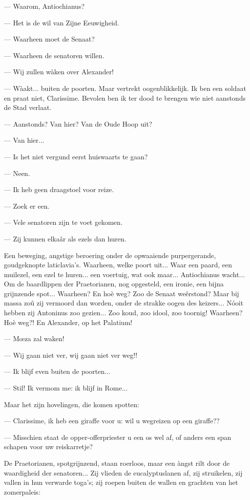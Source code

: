 \documentclass[a4paper, 12pt, oneside, dutch]{article}
\begin{document}
--- Waarom, Antiochianus?

--- Het is de wil van Zijne Eeuwigheid.

--- Waarheen moet de Senaat?

--- Waarheen de senatoren willen.

--- Wij zullen wàken over Alexander!

--- Wàakt... buiten de poorten. Maar vertrekt oogenblikkelijk. Ik ben een soldaat en praat niet, Clarissime. Bevolen ben ik ter dood te brengen wie niet aanstonds de Stad verlaat.

--- Aanstonds? Van hier? Van de Oude Hoop uit?

--- Van hier...

--- Is het niet vergund eerst huiswaarts te gaan?

--- Neen.

--- Ik heb geen draagstoel voor reize.

--- Zoek er een.

--- Vele senatoren zijn te voet gekomen.

--- Zij kunnen elkaâr als ezels dan huren.

Een beweging, angstige beroering onder de opwaaiende purpergerande, goudgeknopte laticlavia's. Waarheen, welke poort uit... Waar een paard, een muilezel, een ezel te huren... een voertuig, wat ook maar... Antiochianus wacht... Om de baardlippen der Praetorianen, nog opgesteld, een ironie, een bijna grijnzende spot... Waarheen? En hoè weg? Zoo de Senaat weêrstond? Maar bij massa zoû zij vermoord dan worden, onder de strakke oogen des keizers... Nóoit hebben zij Antoninus zoo gezien... Zoo koud, zoo idool, zoo toornig! Waarheen? Hoè weg?! En Alexander, op het Palatium!

--- Mœza zal waken!

--- Wij gaan niet ver, wij gaan niet ver weg!!

--- Ik blijf even buiten de poorten...

--- Stil! Ik vermom me: ik blijf in Rome...

Maar het zijn hovelingen, die komen spotten:

--- Clarissime, ik heb een giraffe voor u: wil u wegreizen op een giraffe??

--- Misschien staat de opper-offerpriester u een os wel af, of anders een span schapen voor uw reiskarretje?

De Praetorianen, spotgrijnzend, staan roerloos, maar een àngst rilt door de waardigheid der senatoren... Zij vlieden de eucalyptuslanen af, zij struikelen, zij vallen in hun verwarde toga's; zij roepen buiten de wallen en grachten van het zomerpaleis:
\end{document}
